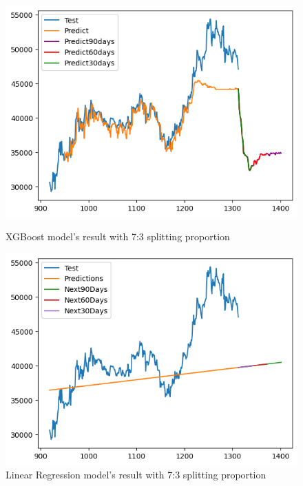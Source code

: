 \documentclass{ieeeojies}
\begin{document}
\begin{figure}[H]
    \centering
    \begin{minipage}{0.45\linewidth}
        \centering
        \includegraphics[width=\linewidth]{bibliography/diagram/XGBoost-BID.png}
        \caption{XGBoost model’s result with 7:3 splitting proportion}
        \label{fig:XGBoost-BID}
    \end{minipage}
    \hfill
    \begin{minipage}{0.45\linewidth}
        \centering
        \includegraphics[width=\linewidth]{bibliography/diagram/LR-BID.png}
        \caption{Linear Regression model’s result with 7:3 splitting proportion}
        \label{fig:LR-BID}
    \end{minipage}
\end{figure}
\end{document}
